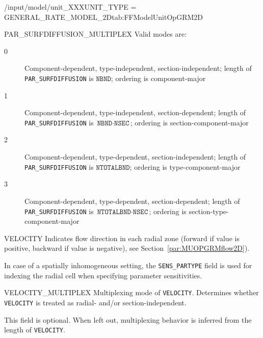 \begin{condsubgroup}{/input/model/unit\_XXX}{UNIT\_TYPE = GENERAL\_RATE\_MODEL\_2D}{tab:FFModelUnitOpGRM2D}
\begin{dataset}[unit=--,type=int,range={$\{0, \dots, 3 \}$},length={1}]{PAR\_SURFDIFFUSION\_MULTIPLEX}
    Valid modes are:
    \begin{description}
      \item[0] Component-dependent, type-independent, section-independent; length of \texttt{PAR\_SURFDIFFUSION} is $\texttt{NBND}$; ordering is component-major
      \item[1] Component-dependent, type-independent, section-dependent; length of \texttt{PAR\_SURFDIFFUSION} is $\texttt{NBND} \cdot \texttt{NSEC}$; ordering is section-component-major
      \item[2] Component-dependent, type-dependent, section-independent; length of \texttt{PAR\_SURFDIFFUSION} is $\texttt{NTOTALBND}$; ordering is type-component-major
      \item[3] Component-dependent, type-dependent, section-dependent; length of \texttt{PAR\_SURFDIFFUSION} is $\texttt{NTOTALBND} \cdot \texttt{NSEC}$; ordering is section-type-component-major
    \end{description}\vspace{-\baselineskip}
  \end{dataset}
  \begin{dataset}[unit=--,type=double,range={$\mathds{R}$},length={see \texttt{VELOCITY\_MULTIPLEX}}]{VELOCITY}
    Indicates flow direction in each radial zone (forward if value is positive, backward if value is negative), see Section~\ref{par:MUOPGRMflow2D}).

    In case of a spatially inhomogeneous setting, the \texttt{SENS\_PARTYPE} field is used for indexing the radial cell when specifying parameter sensitivities.
  \end{dataset}
  \begin{dataset}[unit=--,type=int,range={$\{0, \dots, 3 \}$},length={1}]{VELOCITY\_MULTIPLEX}
    Multiplexing mode of \texttt{VELOCITY}.
    Determines whether \texttt{VELOCITY} is treated as radial- and/or section-independent.

    This field is optional.
    When left out, multiplexing behavior is inferred from the length of \texttt{VELOCITY}.


\end{dataset}
\end{condsubgroup}
